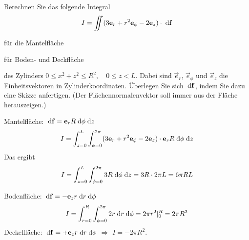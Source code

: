 \begin{atiTask}[
  title = Skalarprodukte im Integranden
]

Berechnen Sie das folgende Integral
\[
I=\iint (3\mathbf{e}_r+r^2\mathbf{e}_\phi-2\mathbf{e}_z)\cdot \;\mathrm{d} \mathbf{f}
\]
\begin{atiSubtasks}
\item für die Mantelfläche
\item für Boden- und Deckfläche
\end{atiSubtasks}
des Zylinders $0\leq x^2+z^2\leq R^2, \quad 0\leq z<L$.
Dabei sind $\vec{e}_r$, $\vec{e}_\phi$ und $\vec{e}_z$ die Einheitsvektoren in Zylinderkoordinaten. Überlegen Sie sich $\;\mathrm{d}\mathbf{f}$, indem Sie dazu eine Skizze anfertigen. (Der Flächennormalenvektor soll immer aus der Fläche herauszeigen.)
\end{atiTask}

\begin{atiSolution}
\begin{atiSubtasks}
\item Mantelfläche: $\;\mathrm{d} \mathbf{f}=\mathbf{e}_rR\;\mathrm{d} \mathbf{\phi}\;\mathrm{d} z$
\[I=\int_{z=0}^L\int_{\phi=0}^{2\pi} (3\mathbf{e}_r+r^2\mathbf{e}_\phi-2\mathbf{e}_z)\cdot \mathbf{e}_r R\;\mathrm{d} \mathbf{\phi}\;\mathrm{d} z
\]
Das ergibt
\[I=\int_{z=0}^L\int_{\phi=0}^{2\pi}3R \;\mathrm{d} \phi\;\mathrm{d} z=3R\cdot 2\pi L=6\pi R L
\]
\item Bodenfläche: $\;\mathrm{d} \mathbf{f}=-\mathbf{e}_z r\;\mathrm{d} r\;\mathrm{d} \mathbf{\phi}$
\[I=\int_{r=0}^R\int_{\phi=0}^{2\pi} 2r\;\mathrm{d} r \;\mathrm{d} \phi = 2\pi r^2|_0^R=2\pi R^2
\]
Deckelfläche: $\;\mathrm{d} \mathbf{f}=+\mathbf{e}_z r\;\mathrm{d} r\;\mathrm{d} \mathbf{\phi}$ $\Rightarrow$ $I=-2\pi R^2$.
\end{atiSubtasks}
\end{atiSolution}